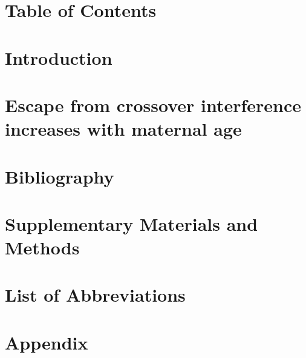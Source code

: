 \documentclass[11pt]{report}
\begin{document}
\clearpage
\chapter*{Table of Contents}
\tableofcontents
\listoffigures
\listoftables


\chapter{Introduction}


\chapter{Escape from crossover interference increases with maternal age}

\setcounter{page}{1}

\clearpage
\chapter{Bibliography}

\clearpage
\chapter{Supplementary Materials and Methods}

\clearpage
\chapter{List of Abbreviations}

\clearpage
\chapter{Appendix}

\end{document}
